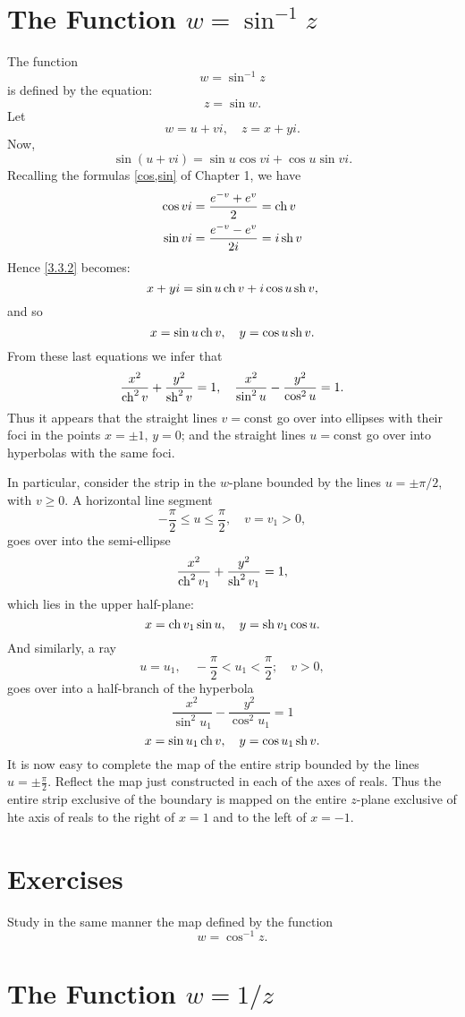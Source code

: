 \documentclass[twosided]{memoir}
\begin{document}
\section{The Function $w=\sin ^{-1}z$}
The function 
\begin{equation}\label{3.3.1}
w=\sin ^{-1}z
\end{equation}
is defined by the equation:
\begin{equation}\label{3.3.2}
z=\sin w.
\end{equation}
Let
\[
w=u+vi,\quad z=x+yi
.\] Now,
\[
	\sin (u+vi)=\sin u\cos vi+\cos u\sin vi
.\] Recalling the formulas \ref{cos,sin} of Chapter 1, we have
\begin{align*}
	\cos vi&=\frac{e^{-v}+e^v}{2} =\operatorname{ch} v\\
	\sin vi&=\frac{e^{-v}-e^v}{2i} =i\operatorname{sh} v
\end{align*}
Hence \ref{3.3.2} becomes:
\begin{equation}\label{3.3.3}
x+yi=\sin u\operatorname{ch} v+i\cos u\operatorname{sh} v,
\end{equation}
and so
\begin{equation}\label{3.3.4}
x=\sin u\operatorname{ch} v,\quad y=\cos u \operatorname{sh} v.
\end{equation}
From these last equations we infer that
\begin{equation}\label{3.3.5}
\frac{x^2}{\operatorname{ch} ^2v}+\frac{y^2}{\operatorname{sh}^2 v}=1,\quad \frac{x^2}{\sin ^2u}-\frac{y^2}{\cos ^2u}=1.
\end{equation}
Thus it appears that the straight lines $v=\text{const} $ go over into ellipses with their foci in the points $x=\pm 1,\, y=0$; and the straight lines $u=\text{const} $ go over into hyperbolas with the same foci.

In particular, consider the strip in the $w$-plane bounded by the lines $u=\pm \pi /2$, with $v\ge 0$. A horizontal line segment
\[
-\frac{\pi}{2}\le u\le \frac{\pi}{2},\quad v=v_1>0,
\]goes over into the semi-ellipse
\[
\frac{x^2}{\operatorname{ch}^2v_1}+\frac{y^2}{\operatorname{sh}^2v_1}=1,
\] which lies in the upper half-plane:
\[
x=\operatorname{ch} v_1\sin u,\quad y=\operatorname{sh} v_1\cos u
.\] And similarly, a ray
\[
u=u_1, \quad -\frac{\pi}{2}<u_1<\frac{\pi}{2}; \quad v>0
,\] goes over into a half-branch of the hyperbola
\[
\frac{x^2}{\sin ^2u_1}-\frac{y^2}{\cos ^2u_1}=1
\]
\[
x=\sin u_1\operatorname{ch} v,\quad y=\cos u_1\operatorname{sh} v
.\] It is now easy to complete the map of the entire strip bounded by the lines $u=\pm \frac{\pi}{2}$. Reflect the map just constructed in each of the axes of reals. Thus the entire strip exclusive of the boundary is mapped on the entire $z$-plane exclusive of hte axis of reals to the right of $x=1$ and to the left of $x=-1$.

\section*{Exercises}
\problem Study in the same manner the map defined by the function
\[
w=\cos ^{-1}z
.\] 

\section{The Function $w=1 /z$}
\end{document}
